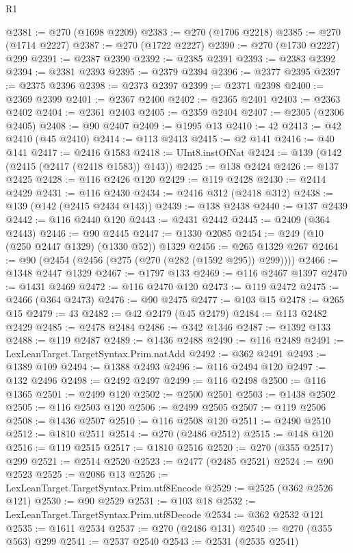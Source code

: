 \begin{lexlean}{R1}
\begin{coremodule}
@2381 := @270 (@1698 @2209)
@2383 := @270 (@1706 @2218)
@2385 := @270 (@1714 @2227)
@2387 := @270 (@1722 @2227)
@2390 := @270 (@1730 @2227) @299
@2391 := @2387 @2390
@2392 := @2385 @2391
@2393 := @2383 @2392
@2394 := @2381 @2393
@2395 := @2379 @2394
@2396 := @2377 @2395
@2397 := @2375 @2396
@2398 := @2373 @2397
@2399 := @2371 @2398
@2400 := @2369 @2399
@2401 := @2367 @2400
@2402 := @2365 @2401
@2403 := @2363 @2402
@2404 := @2361 @2403
@2405 := @2359 @2404
@2407 := @2305 (@2306 @2405)
@2408 := @90 @2407
@2409 := @1995 @13
@2410 := 42
@2413 := @42 @2410 (@45 @2410)
@2414 := @113 @2413
@2415 := @2 @141
@2416 := @40 @141
@2417 := @2416 @1583
@2418 := UInt8.instOfNat
@2424 := @139 (@142 (@2415 (@2417 (@2418 @1583)) @143))
@2425 := @138 @2424
@2426 := @137 @2425
@2428 := @116 @2426 @120
@2429 := @119 @2428
@2430 := @2414 @2429
@2431 := @116 @2430
@2434 := @2416 @312 (@2418 @312)
@2438 := @139 (@142 (@2415 @2434 @143))
@2439 := @138 @2438
@2440 := @137 @2439
@2442 := @116 @2440 @120
@2443 := @2431 @2442
@2445 := @2409 (@364 @2443)
@2446 := @90 @2445
@2447 := @1330 @2085
@2454 := @249 (@10 (@250 @2447 @1329) (@1330 @52)) @1329
@2456 := @265 @1329 @267
@2464 := @90 (@2454 (@2456 (@275 (@270 (@282 (@1592 @295)) @299))))
@2466 := @1348 @2447 @1329
@2467 := @1797 @133
@2469 := @116 @2467 @1397
@2470 := @1431 @2469
@2472 := @116 @2470 @120
@2473 := @119 @2472
@2475 := @2466 (@364 @2473)
@2476 := @90 @2475
@2477 := @103 @15
@2478 := @265 @15
@2479 := 43
@2482 := @42 @2479 (@45 @2479)
@2484 := @113 @2482 @2429
@2485 := @2478 @2484
@2486 := @342 @1346
@2487 := @1392 @133
@2488 := @119 @2487
@2489 := @1436 @2488
@2490 := @116 @2489
@2491 := LexLeanTarget.TargetSyntax.Prim.natAdd
@2492 := @362 @2491
@2493 := @1389 @109
@2494 := @1388 @2493
@2496 := @116 @2494 @120
@2497 := @132 @2496
@2498 := @2492 @2497
@2499 := @116 @2498
@2500 := @116 @1365
@2501 := @2499 @120
@2502 := @2500 @2501
@2503 := @1438 @2502
@2505 := @116 @2503 @120
@2506 := @2499 @2505
@2507 := @119 @2506
@2508 := @1436 @2507
@2510 := @116 @2508 @120
@2511 := @2490 @2510
@2512 := @1810 @2511
@2514 := @270 (@2486 @2512)
@2515 := @148 @120
@2516 := @119 @2515
@2517 := @1810 @2516
@2520 := @270 (@355 @2517) @299
@2521 := @2514 @2520
@2523 := @2477 (@2485 @2521)
@2524 := @90 @2523
@2525 := @2086 @13
@2526 := LexLeanTarget.TargetSyntax.Prim.utf8Encode
@2529 := @2525 (@362 @2526 @121)
@2530 := @90 @2529
@2531 := @103 @18
@2532 := LexLeanTarget.TargetSyntax.Prim.utf8Decode
@2534 := @362 @2532 @121
@2535 := @1611 @2534
@2537 := @270 (@2486 @131)
@2540 := @270 (@355 @563) @299
@2541 := @2537 @2540
@2543 := @2531 (@2535 @2541)

\end{coremodule}
\end{lexlean}
